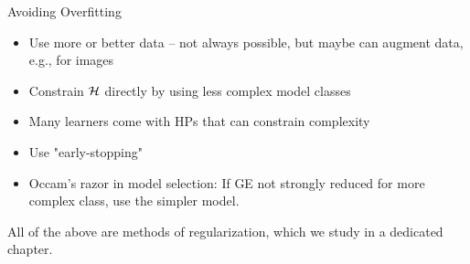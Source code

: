 \documentclass[11pt,compress,t,notes=noshow, xcolor=table]{beamer}
\begin{document}
\begin{vbframe}{Avoiding Overfitting}

\begin{itemize}
  \item Use more or better data -- not always possible, but maybe can augment data, 
      e.g., for images
  \item Constrain $\mathcal{H}$ directly by using less complex model classes
  \item Many learners come with HPs that can 
      constrain complexity
  \item Use "early-stopping"
\item Occam's razor in model selection: 
    If GE not strongly reduced for more complex class,
    use the simpler model.
\end{itemize}

\lz

All of the above are methods of regularization,
which we study in a dedicated chapter.

\end{vbframe}

\endlecture
\end{document}
